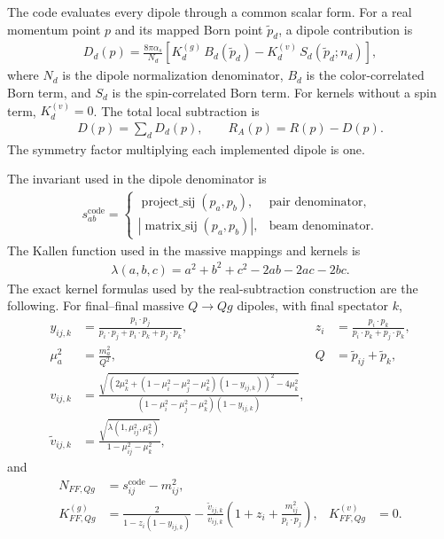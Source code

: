 \documentclass[11pt]{article}
\begin{document}
The code evaluates every dipole through a common scalar form. For a real momentum point $p$ and its mapped Born point $\tilde p_d$, a dipole contribution is
\begin{align}
D_d(p) =
\frac{8\pi\alpha_s}{N_d}
\left[K_d^{(g)}\,B_d(\tilde p_d)-K_d^{(v)}\,S_d(\tilde p_d;n_d)\right],
\label{eq:local-dipole-master}
\end{align}
where $N_d$ is the dipole normalization denominator, $B_d$ is the color-correlated Born term, and $S_d$ is the spin-correlated Born term. For kernels without a spin term, $K_d^{(v)}=0$. The total local subtraction is
\begin{align}
D(p)=\sum_d D_d(p),
\qquad
R_A(p)=R(p)-D(p).
\end{align}
The symmetry factor multiplying each implemented dipole is one.

The invariant used in the dipole denominator is
\begin{align}
s_{ab}^{\text{code}}=
\begin{cases}
\operatorname{project\_sij}(p_a,p_b), & \text{pair denominator},\\
|\operatorname{matrix\_sij}(p_a,p_b)|, & \text{beam denominator}.
\end{cases}
\end{align}
The Kallen function used in the massive mappings and kernels is
\begin{align}
\lambda(a,b,c)=a^2+b^2+c^2-2ab-2ac-2bc.
\end{align}
The exact kernel formulas used by the real-subtraction construction are the following. For final--final massive $Q\to Qg$ dipoles, with final spectator $k$,
\begin{align}
y_{ij,k} &= \frac{p_i\!\cdot p_j}{p_i\!\cdot p_j+p_i\!\cdot p_k+p_j\!\cdot p_k},
&z_i &= \frac{p_i\!\cdot p_k}{p_i\!\cdot p_k+p_j\!\cdot p_k},\\
\mu_a^2&=\frac{m_a^2}{Q^2},
&Q&=\tilde p_{ij}+\tilde p_k,\\
v_{ij,k}&=
\frac{\sqrt{\left(2\mu_k^2+(1-\mu_i^2-\mu_j^2-\mu_k^2)(1-y_{ij,k})\right)^2-4\mu_k^2}}
{(1-\mu_i^2-\mu_j^2-\mu_k^2)(1-y_{ij,k})},\\
\tilde v_{ij,k}&=
\frac{\sqrt{\lambda(1,\mu_{ij}^2,\mu_k^2)}}{1-\mu_{ij}^2-\mu_k^2},
\end{align}
and
\begin{align}
N_{FF,Qg} &= s_{ij}^{\text{code}}-m_{ij}^2,\\
K^{(g)}_{FF,Qg} &=
\frac{2}{1-z_i(1-y_{ij,k})}
-\frac{\tilde v_{ij,k}}{v_{ij,k}}
\left(1+z_i+\frac{m_{ij}^2}{p_i\!\cdot p_j}\right),
&K^{(v)}_{FF,Qg}&=0.
\end{align}
\end{document}

